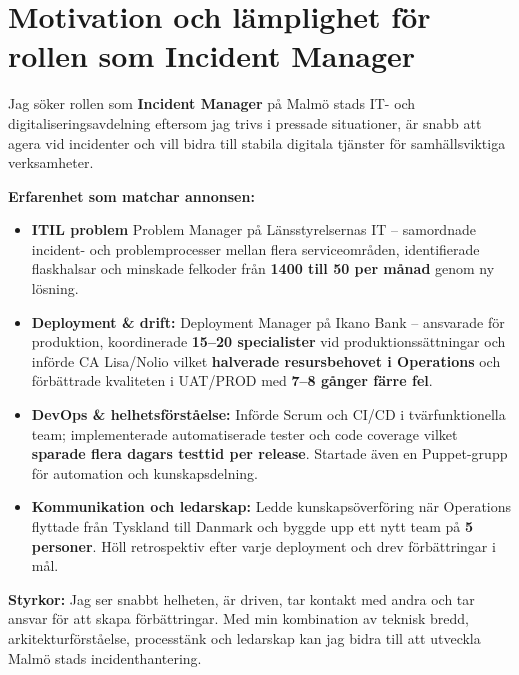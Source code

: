 \section*{Motivation och lämplighet för rollen som Incident Manager}

Jag söker rollen som \textbf{Incident Manager} på Malmö stads IT- och digitaliseringsavdelning eftersom jag trivs i pressade situationer, är snabb att agera vid incidenter och vill bidra till stabila digitala tjänster för samhällsviktiga verksamheter.

\textbf{Erfarenhet som matchar annonsen:}
\begin{itemize}
  \item \textbf{ITIL problem} Problem Manager på Länsstyrelsernas IT – samordnade incident- och problemprocesser mellan flera serviceområden, identifierade flaskhalsar och minskade felkoder från \textbf{1400 till 50 per månad} genom ny lösning.
  \item \textbf{Deployment \& drift:} Deployment Manager på Ikano Bank – ansvarade för produktion, koordinerade \textbf{15–20 specialister} vid produktionssättningar och införde CA Lisa/Nolio vilket \textbf{halverade resursbehovet i Operations} och förbättrade kvaliteten i UAT/PROD med \textbf{7–8 gånger färre fel}.
  \item \textbf{DevOps \& helhetsförståelse:} Införde Scrum och CI/CD i tvärfunktionella team; implementerade automatiserade tester och code coverage vilket \textbf{sparade flera dagars testtid per release}. Startade även en Puppet-grupp för automation och kunskapsdelning.
  \item \textbf{Kommunikation och ledarskap:} Ledde kunskapsöverföring när Operations flyttade från Tyskland till Danmark och byggde upp ett nytt team på \textbf{5 personer}. Höll retrospektiv efter varje deployment och drev förbättringar i mål. 
\end{itemize}

\textbf{Styrkor:} Jag ser snabbt helheten, är driven, tar kontakt med andra och tar ansvar för att skapa förbättringar. Med min kombination av teknisk bredd, arkitekturförståelse, processtänk och ledarskap kan jag bidra till att utveckla Malmö stads incidenthantering.
